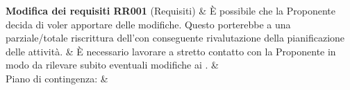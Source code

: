 \documentclass[PianoDiProgetto.tex]{subfiles}
\begin{document}
\begin{longtabu}
	
	 \textbf{Modifica dei requisiti RR001} (Requisiti)
	&
	{\small È possibile che la Proponente \Proponente decida di voler apportare delle modifiche. Questo porterebbe a una parziale/totale riscrittura dell'\adr con conseguente rivalutazione della pianificazione delle attività.}
	&
	{\small È necessario lavorare a stretto contatto con la Proponente in modo da rilevare subito eventuali modifiche ai .}
	&
	  \\
	 Piano di contingenza:
	&
	\\
	\hhline{====}
		
\end{longtabu}
\end{document}
